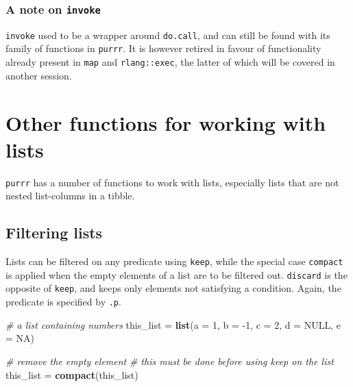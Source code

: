 \documentclass[]{book}
\newenvironment{Shaded}{}{}
\newcommand{\CommentTok}[1]{\textcolor[rgb]{0.38,0.63,0.69}{\textit{#1}}}
\newcommand{\DataTypeTok}[1]{\textcolor[rgb]{0.56,0.13,0.00}{#1}}
\newcommand{\DecValTok}[1]{\textcolor[rgb]{0.25,0.63,0.44}{#1}}
\newcommand{\KeywordTok}[1]{\textcolor[rgb]{0.00,0.44,0.13}{\textbf{#1}}}
\newcommand{\NormalTok}[1]{#1}
\newcommand{\OtherTok}[1]{\textcolor[rgb]{0.00,0.44,0.13}{#1}}
\newcommand{\StringTok}[1]{\textcolor[rgb]{0.25,0.44,0.63}{#1}}
\begin{document}
\hypertarget{a-note-on-invoke}{%
\subsubsection*{\texorpdfstring{A note on \texttt{invoke}}{A note on invoke}}\label{a-note-on-invoke}}

\texttt{invoke} used to be a wrapper around \texttt{do.call}, and can still be found with its family of functions in \texttt{purrr}. It is however retired in favour of functionality already present in \texttt{map} and \texttt{rlang::exec}, the latter of which will be covered in another session.

\hypertarget{other-functions-for-working-with-lists}{%
\section{Other functions for working with lists}\label{other-functions-for-working-with-lists}}

\texttt{purrr} has a number of functions to work with lists, especially lists that are not nested list-columns in a tibble.

\hypertarget{filtering-lists}{%
\subsection{Filtering lists}\label{filtering-lists}}

Lists can be filtered on any predicate using \texttt{keep}, while the special case \texttt{compact} is applied when the empty elements of a list are to be filtered out. \texttt{discard} is the opposite of \texttt{keep}, and keeps only elements not satisfying a condition. Again, the predicate is specified by \texttt{.p}.

\begin{Shaded}
\begin{Highlighting}[]
\CommentTok{# a list containing numbers}
\NormalTok{this_list =}\StringTok{ }\KeywordTok{list}\NormalTok{(}\DataTypeTok{a =} \DecValTok{1}\NormalTok{, }\DataTypeTok{b =} \DecValTok{-1}\NormalTok{, }\DataTypeTok{c =} \DecValTok{2}\NormalTok{, }\DataTypeTok{d =} \OtherTok{NULL}\NormalTok{, }\DataTypeTok{e =} \OtherTok{NA}\NormalTok{)}

\CommentTok{# remove the empty element}
\CommentTok{# this must be done before using keep on the list}
\NormalTok{this_list =}\StringTok{ }\KeywordTok{compact}\NormalTok{(this_list)}
\end{Highlighting}
\end{Shaded}
\end{document}
